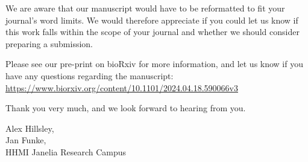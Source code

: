 \documentclass{article}
\begin{document}
We are aware that our manuscript would have to be reformatted to fit your
journal's word limits. We would therefore appreciate if you could let us know
if this work falls within the scope of your journal and whether we should
consider preparing a submission.

Please see our pre-print on bioRxiv for more information, and let us know if
you have any questions regarding the manuscript:
\url{https://www.biorxiv.org/content/10.1101/2024.04.18.590066v3}

Thank you very much, and we look forward to hearing from you.

\vspace{5mm}
Alex Hillsley,\\
Jan Funke,\\
HHMI Janelia Research Campus
\end{document}
